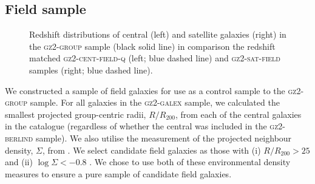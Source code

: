 \documentclass[useAMS,usenatbib]{mn2e}
\begin{document}
\subsection{Field sample}\label{sec:field}

\begin{figure}
\caption[Redshift distribution of galaxies in the \textsc{gz2-group} sample]{Redshift distributions of central (left) and satellite galaxies (right) in the \textsc{gz2-group} sample (black solid line) in comparison the redshift matched \textsc{gz2-cent-field-q} (left; blue dashed line) and \textsc{gz2-sat-field} samples (right; blue dashed line).}
\label{fig:zcompare}
\end{figure}

We constructed a sample of field galaxies for use as a control sample to the \textsc{gz2-group} sample. For all galaxies in the \textsc{gz2-galex} sample, we calculated the smallest projected group-centric radii, $R/R_{200}$, from each of the central galaxies in the \citet{berlind06} catalogue (regardless of whether the central was included in the \textsc{gz2-berlind} sample). We also utilise the measurement of the projected neighbour density, $\Sigma$, from \cite{Baldry06}. We select candidate field galaxies as those with (i) $R/R_{200} > 25$ and (ii) $\log\Sigma < -0.8$ \citep[the threshold on the local environment density which selects field galaxies as defined by][]{Baldry06}. We chose to use both of these environmental density measures to ensure a pure sample of candidate field galaxies.
\end{document}
